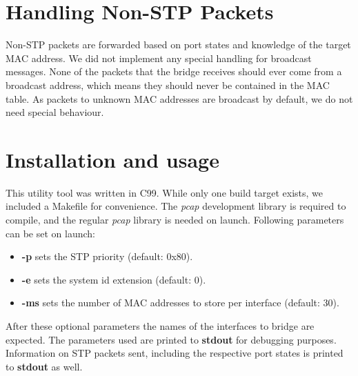 \section{Handling Non-STP Packets}
Non-STP packets are forwarded based on port states and knowledge of the target MAC address.
We did not implement any special handling for broadcast messages.
None of the packets that the bridge receives should ever come from a broadcast address, which means they should never be contained in the MAC table.
As packets to unknown MAC addresses are broadcast by default, we do not need special behaviour.


\section{Installation and usage}
This utility tool was written in C99\cite{c99}.
While only one build target exists, we included a Makefile for convenience.
The \textit{pcap} development library is required to compile, and the regular \textit{pcap} library is needed on launch.
Following parameters can be set on launch:
\begin{itemize}
    \item \textbf{-p} sets the STP priority (default: 0x80).
    \item \textbf{-e} sets the system id extension (default: 0).
    \item \textbf{-ms} sets the number of MAC addresses to store per interface (default: 30).
\end{itemize}
After these optional parameters the names of the interfaces to bridge are expected.
The parameters used are printed to \textbf{stdout} for debugging purposes.
Information on STP packets sent, including the respective port states is printed to \textbf{stdout} as well.
